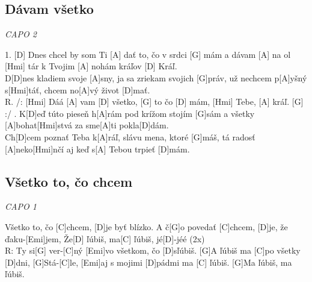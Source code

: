 \documentclass[10pt]{article}
\begin{document}
\begin{Large}
\begin{minipage}{\textwidth}
\subsection{Dávam všetko}
\textit{CAPO 2}\\
\begin{multicols}{2}
\begin{guitar}	
	1. [D] Dnes chcel by som Ti [A] dať
	to, čo v srdci [G] mám
	a dávam [A] na ol [Hmi] tár
	k Tvojim [A] nohám kráľov [D] Kráľ.
	\\
	D[D]nes kladiem svoje [A]sny,
	ja sa zriekam svojich [G]práv,
	už nechcem p[A]yšný s[Hmi]táť,
	chcem no[A]vý život [D]mať.
	\\
	R. /: [Hmi] Dáá [A] vam [D] všetko,
	[G] to čo [D] mám, [Hmi] Tebe, [A] kráľ. [G] :/
	. K[D]eď túto pieseň h[A]rám
	pod krížom stojím [G]sám
	a všetky [A]bohat[Hmi]stvá
	za sme[A]ti pokla[D]dám.
	\\
	Ch[D]cem poznať Teba k[A]ráľ,
	slávu mena, ktoré [G]máš,
	tá radosť [A]neko[Hmi]nčí
	aj keď s[A] Tebou trpieť [D]mám.
\end{guitar}
\end{multicols}
\end{minipage}

\begin{minipage}{\textwidth}
\subsection{Všetko to, čo chcem}
\textit{CAPO 1}\\
\begin{multicols}{2}
\begin{guitar}	
	[G]Všetko to, čo [C]chcem, 
	[D]je byť blízko.
	A č[G]o povedať [C]chcem, 
	[D]je, že ďaku-[Emi]jem,
	Že[D] ľúbiš, ma[C] ľúbiš, jé[D]-jéé (2x)
	\\
	R: Ty si[G] ver-[C]ný 
	[Emi]vo všetkom, čo [D]sľúbiš.
	[G]A ľúbiš ma [C]po všetky [D]dni,
	[G]Stá-[C]le, [Emi]aj s mojimi [D]pádmi ma [C] ľúbiš.
	[G]Ma ľúbiš, ma ľúbiš.
\end{guitar}
\end{multicols}
\end{minipage}

\begin{minipage}{\textwidth}

\end{minipage}
\end{Large}
\end{document}
